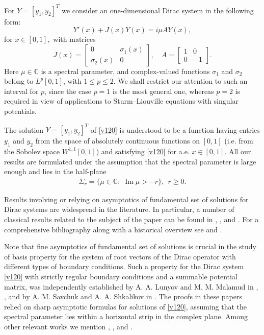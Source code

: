 \documentclass[11pt]{amsart}
\theoremstyle{plain}
\theoremstyle{definition}
\theoremstyle{remark}
\numberwithin{equation}{section}
\renewcommand\Im{\operatorname{Im}}
\begin{document}
For $Y=[y_1,y_2]^T$ we consider an one-dimensional  Dirac system in the following form:
\begin{equation}\label{v120}
Y'(x)+J(x) Y(x)=i\mu A Y(x),
\end{equation}
for $x\in [0,1],$ with matrices
\begin{equation}\label{matrixA}
J(x)=\left[\begin{array}{cc}
0 & \sigma_1(x)\\
\sigma_2(x) & 0
\end{array}
\right], \quad A=\left[\begin{array}{cc}
1 & 0\\
0 &-1
\end{array}
\right].
\end{equation}
Here $\mu\in \mathbb{C}$ is a spectral parameter, and  complex-valued functions $\sigma_1$ and $\sigma_2$ belong to
$L^p[0,1]$, with $1\leq p \leq 2$. We shall restrict our attention to such an interval for
$p$, since the case $p=1$ is the most general one, whereas $p=2$ is required in view of applications
to Sturm--Liouville equations with singular potentials.

The solution $Y=[y_1, y_2]^T$ of \eqref{v120} is understood to be a function having entries $y_1$ and $y_2$ from
the space of absolutely continuous  functions on $[0,1]$
(i.e. from the Sobolev space $W^{1,1}[0,1]$)
and satisfying  \eqref{v120} for a.e. $x\in [0,1]$. All our results are formulated under the assumption that the spectral parameter is large enough and lies in the half-plane
\begin{align}
\Sigma_r=\{\mu \in \mathbb{C} : \; \Im \mu > -r \}, \ \ r\geq0. \label{half}
\end{align}

Results involving or relying on asymptotics of fundamental set of solutions for Dirac systems are widespread in the literature. In particular, a number of classical results related to the subject of the paper can be found in \cite{BirLan}, \cite{Levi}, \cite{Rykhlov99} and \cite{March}. For a comprehensive bibliography along with a historical overview see
\cite{SSasy} and \cite{SaKos}.

Note that fine asymptotics of fundamental set of solutions
is crucial in the study of
 basis property for the system of root vectors of the Dirac operator with different types of boundary conditions.
Such a property for the Dirac system \eqref{v120} with strictly regular boundary conditions and a summable potential matrix, was independently established by A. A. Lunyov and
M. M. Malamud in \cite{LM14}, \cite{LMal}, and by A. M. Savchuk and A. A. Shkalikov in \cite{SSDirac}.
The proofs in these papers relied on sharp asymptotic formulas for solutions of \eqref{v120}, assuming that the spectral parameter lies within a horizontal strip in the complex plane.
Among other relevant works we mention \cite{MalOri12}, \cite{DM},
\cite{Makin20} and \cite{Makin24}.
\end{document}
